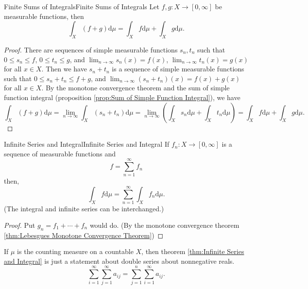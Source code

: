 \documentclass[../main.tex]{subfiles}
\begin{document}
\begin{theorem}{Finite Sums of Integrals}{Finite Sums of Integrals}
	Let $f,g:X \rightarrow [0,\infty ]$ be measurable functions, then
	\begin{equation*}
		\int_X (f+g) \mathrm{d} \mu = \int_X f \mathrm{d} \mu + \int_X g \mathrm{d} \mu.
	\end{equation*}
\end{theorem}
\begin{proof}
	There are sequences of simple measurable functions $s_n, t_n$ such that $0\leq s_n \leq f$, $0\leq t_n \leq g$, and $\lim_{n\rightarrow \infty } s_n(x) = f(x)$, $\lim_{n\rightarrow \infty } t_n(x) = g(x)$ for all $x\in X$. Then we have $s_n + t_n$ is a sequence of simple measurable functions such that $0\leq s_n + t_n \leq f+g$, and $\lim_{n\rightarrow \infty } (s_n + t_n)(x) = f(x) + g(x)$ for all $x\in X$. By the monotone convergence theorem and the sum of simple function integral (proposition \ref{prop:Sum of Simple Function Integral}), we have
	\begin{equation*}
		\int_X (f+g) \mathrm{d} \mu = \lim_{n\rightarrow \infty } \int_X (s_n + t_n) \mathrm{d} \mu = \lim_{n\rightarrow \infty } \left( \int_X s_n \mathrm{d} \mu + \int_X t_n \mathrm{d} \mu \right) = \int_X f \mathrm{d} \mu + \int_X g \mathrm{d} \mu.
	\end{equation*}
\end{proof}

\begin{theorem}{Infinite Series and Integral}{Infinite Series and Integral}
	If $f_n: X \rightarrow [0,\infty ]$ is a sequence of measurable functions and
	\begin{equation*}
		f = \sum_{n=1}^{\infty } f_n
	\end{equation*}
	then,
	\begin{equation*}
		\int_X f \mathrm{d} \mu = \sum_{n=1}^{\infty } \int_X f_n \mathrm{d} \mu.
	\end{equation*}
	(The integral and infinite series can be interchanged.)
\end{theorem}
\begin{proof}
	Put $g_n = f_1+\cdots +f_n$ would do. (By the monotone convergence theorem \ref{thm:Lebesgues Monotone Convergence Theorem})
\end{proof}

\begin{remark}
	If $\mu$ is the counting measure on a countable $X$, then theorem \ref{thm:Infinite Series and Integral} is just a statement about double series about nonnegative reals.
	\begin{equation*}
		\sum_{i=1}^{\infty } \sum_{j=1}^{\infty } a_{ij} = \sum_{j=1}^{n} \sum_{i=1}^{\infty } a_{ij}.
	\end{equation*}
\end{remark}
\end{document}
